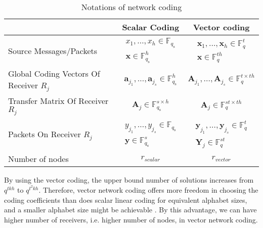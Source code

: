 \begin{table}[H]
\caption{Notations of network coding}

\label{tab:notations} 
\centering{}%
\begin{tabular}{|>{\centering}p{0.2\paperwidth}|c|c|}
\hline 
 & Scalar Coding & Vector coding\tabularnewline
\hline 
\hline 
Source Messages/Packets & $\begin{array}{c}
x_{1},\ldots,x_{h}\in\ensuremath{\mathbb{F}}_{q_{\mathrm{s}}}\\
\boldsymbol{x}\in\ensuremath{\mathbb{F}}_{q_{\mathrm{s}}}^{h}
\end{array}$ & $\begin{array}{c}
\boldsymbol{x}_{1},\ldots,\boldsymbol{x}_{h}\in\ensuremath{\mathbb{F}}_{q}^{t}\\
\boldsymbol{x}\in\ensuremath{\mathbb{F}}_{q}^{th}
\end{array}$\tabularnewline
\hline 
Global Coding Vectors Of Receiver $R_{j}$ & $\boldsymbol{a}_{j_{1}},\ldots,\boldsymbol{a}_{j_{s}}\in\ensuremath{\mathbb{F}}_{q_{\mathrm{s}}}^{h}$ & $\boldsymbol{A}_{j_{1}},\ldots,\boldsymbol{A}_{j_{s}}\in\ensuremath{\mathbb{F}}_{q}^{t\times th}$\tabularnewline
\hline 
Transfer Matrix Of Receiver $R_{j}$ & $\boldsymbol{A}_{j}\in\ensuremath{\mathbb{F}}_{q_{\mathrm{s}}}^{s\times h}$ & $\boldsymbol{A}_{j}\in\ensuremath{\mathbb{F}}_{q}^{st\times th}$\tabularnewline
\hline 
Packets On Receiver $R_{j}$ & $\begin{array}{c}
y_{j_{1}},\ldots,y_{j_{s}}\in\ensuremath{\mathbb{F}}_{q_{\mathrm{s}}}\\
\boldsymbol{y}\in\ensuremath{\mathbb{F}}_{q_{\mathrm{s}}}^{s}
\end{array}$ & $\begin{array}{c}
\boldsymbol{y}_{j_{1}},\ldots,\boldsymbol{y}_{j_{s}}\in\ensuremath{\mathbb{F}}_{q}^{t}\\
\boldsymbol{Y}_{j}\in\ensuremath{\mathbb{F}}_{q}^{st}
\end{array}$\tabularnewline
\hline 
Number of nodes & $r_{scalar}$ & $r_{vector}$\tabularnewline
\hline 
\end{tabular}
\end{table}

\begin{rem}
By using the vector coding, the upper bound number of solutions increases
from $q^{tkh}$ to $q^{t^{2}kh}$. Therefore, vector network coding
offers more freedom in choosing the coding coefficients than does
scalar linear coding for equivalent alphabet sizes, and a smaller
alphabet size might be achievable \cite{Ebrahimi:2011}. By this advantage,
we can have higher number of receivers, i.e. higher number of nodes,
in vector network coding.
\end{rem}

